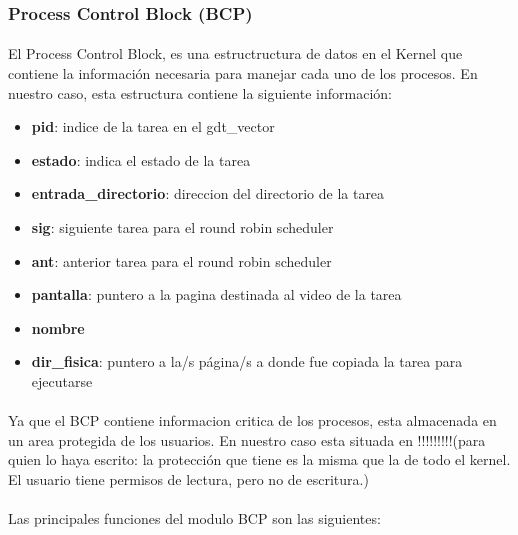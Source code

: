 \documentclass[11pt, a4paper]{article}
\begin{document}
\subsubsection{Process Control Block (BCP) }

\paragraph{}
El Process Control Block, es una estructructura de datos en el Kernel que contiene la información necesaria para manejar cada uno de los procesos.
En nuestro caso, esta estructura contiene la siguiente información:
\begin{itemize}
\item \textbf{pid}: indice de la tarea en el gdt\_vector
\item \textbf{estado}: indica el estado de la tarea
\item \textbf{entrada\_directorio}: direccion del directorio de la tarea
\item \textbf{sig}: siguiente tarea para el round robin scheduler
\item \textbf{ant}: anterior tarea para el round robin scheduler
\item \textbf{pantalla}: puntero a la pagina destinada al video de la tarea
\item \textbf{nombre}
\item \textbf{dir\_fisica}: puntero a la/s página/s a donde fue copiada la tarea para ejecutarse
\end{itemize}

\paragraph{}
Ya que el BCP contiene informacion critica de los procesos, esta almacenada en un area protegida de los usuarios. En nuestro caso esta situada en !!!!!!!!!(para quien lo haya escrito: la protección que tiene es la misma que la de todo el kernel. El usuario tiene permisos de lectura, pero no de escritura.)

\paragraph{}
Las principales funciones del modulo BCP son las siguientes:
\end{document}
